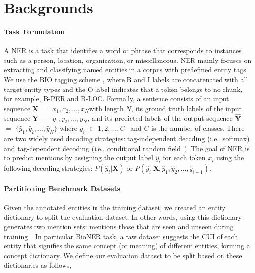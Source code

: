 \documentclass[11pt]{article}
\begin{document}
\section{Backgrounds}
\paragraph{Task Formulation}
A NER is a task that identifies a word or phrase that corresponds to instances such as a person, location, organization, or miscellaneous.
NER mainly focuses on extracting and classifying named entities in a corpus with predefined entity tags.
We use the BIO tagging scheme \cite{ramshaw1999text}, where B and I labels are concatenated with all target entity types and the O label indicates that a token belongs to no chunk, for example, B-PER and B-LOC.
Formally, a sentence consists of an input sequence \textbf{X} $=$ \textbraceleft$x_1, x_2, \ldots, x_N$\textbraceright with length $N$, its ground truth labels of the input sequence \textbf{Y} $=$ \textbraceleft$y_1, y_2, \ldots, y_N$\textbraceright, and its predicted labels of the output sequence $\hat{\textbf{Y}}$ $=$ $\{\hat{y}_1, \hat{y}_2, \ldots, \hat{y}_N\}$ where $y_i$ $\in$ \textbraceleft$1, 2, \ldots, C$\textbraceright~ and $C$ is the number of classes. 
There are two widely used decoding strategies: tag-independent decoding (i.e., softmax) and tag-dependent decoding (i.e., conditional random field~\cite{lafferty2001conditional}).
The goal of NER is to predict mentions by assigning the output label $\hat{y}_{i}$ for each token $x_{i}$ using the following decoding strategies: $P(\hat{y}_i | \textbf{X})$ or $P(\hat{y}_i | \textbf{X}, \hat{y}_1, \hat{y}_2, \ldots, \hat{y}_{i-1})$.

\paragraph{Partitioning Benchmark Datasets}
\label{sec:partition}
Given the annotated entities in the training dataset, we created an entity dictionary to split the evaluation dataset.
In other words, using this dictionary generates two mention sets: mentions those that are seen and unseen during training~\cite{lin2020rigourous, kim2021your}.
In particular BioNER task, a raw dataset suggests the CUI of each entity that signifies the same concept (or meaning) of different entities, forming a concept dictionary.
We define our evaluation dataset to be split based on these dictionaries as follows,
\end{document}
